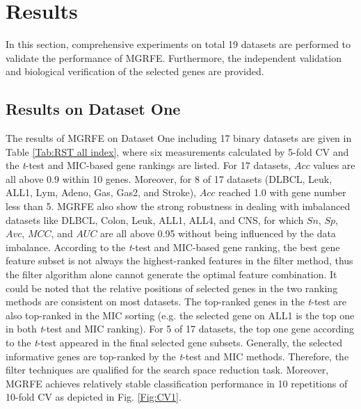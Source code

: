 \documentclass[10pt,journal,compsoc]{IEEEtran}
\begin{document}
	\section{Results}
	
	In this section, comprehensive experiments on total 19 datasets are performed to validate the performance of MGRFE.  
	Furthermore, the independent validation and biological verification of the selected genes are provided.
	
	\subsection{Results on Dataset One}
	 
	The results of MGRFE on Dataset One including 17 binary datasets are given in Table \ref{Tab:RST all index}, where six measurements calculated by 5-fold CV and the \textit{t}-test and MIC-based gene rankings are listed. For 17 datasets, \(Acc\) values are all above 0.9 within 10 genes. Moreover, for 8 of 17 datasets (DLBCL, Leuk, ALL1, Lym, Adeno, Gas, Gas2, and Stroke), \(Acc\) reached 1.0 with gene number less than 5. MGRFE also show the strong robustness in dealing with imbalanced datasets like DLBCL, Colon, Leuk, ALL1, ALL4, and CNS, for which \(Sn\), \(Sp\), \(Avc\), \(MCC\), and \(AUC\) are all above 0.95 without being influenced by the data imbalance. 
	According to the \textit{t}-test and MIC-based gene ranking, the best gene feature subset is not always the highest-ranked features in the filter method, thus the filter algorithm alone cannot generate the optimal feature combination.
	It could be noted that the relative positions of selected genes in the two ranking methods are consistent on most datasets. The top-ranked genes in the \textit{t}-test are also top-ranked in the MIC sorting (e.g. the selected gene on ALL1 is the top one in both \textit{t}-test and MIC ranking). For 5 of 17 datasets, the top one gene  according to the \textit{t}-test appeared in the final selected gene subsets. Generally, the selected informative genes are top-ranked by the \textit{t}-test and MIC methods. Therefore, the filter techniques are qualified for the search space reduction task. Moreover, MGRFE achieves relatively stable classification performance in 10 repetitions of 10-fold CV as depicted in Fig. \ref{Fig:CV1}. 
	
\end{document}
